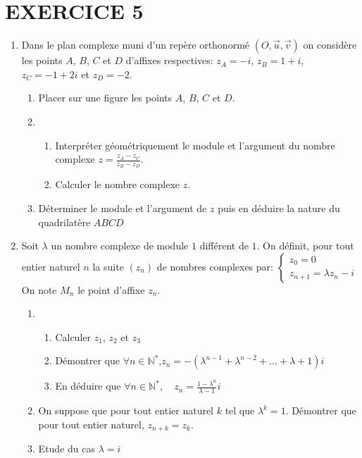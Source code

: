 \documentclass[13pts]{report}
\begin{document}
	\section*{EXERCICE 5}
	\begin{enumerate}
		\item Dans le plan complexe muni d'un repère orthonormé $(O,\overrightarrow{u},\overrightarrow{v})$ on considère les points $A$, $B$, $C$ et $D$ d'affixes respectives: $z_A=-i$, $z_B=1+i$, $z_C=-1+2i$ et $z_D=-2$.
			\begin{enumerate}
				\item Placer sur une figure les points $A$, $B$, $C$ et $D$.
				\item \begin{enumerate}
						\item Interpréter géométriquement le module et l'argument du nombre complexe $z=\frac{z_A-z_C}{z_B-z_D}$.
						\item Calculer le nombre complexe $z$.
				   	  \end{enumerate}
				\item Déterminer le module et l'argument de $z$ puis en déduire la nature du quadrilatère $ABCD$
			\end{enumerate}
		\item Soit $\lambda$ un nombre complexe de module $1$ différent de $1$. On définit, pour tout entier naturel $n$ la suite $(z_n)$ de nombres complexes par: $\left\{\begin{array}{l}
																		z_0=0\\
																		z_{n+1}=\lambda z_n-i
																	\end{array}   \right.$
		On note $M_n$ le point d'affixe $z_n$.
			\begin{enumerate}
				\item \begin{enumerate}
						\item Calculer $z_1$, $z_2$ et $z_3$
						\item Démontrer que $\forall n \in \mathbb{N}^*$,\quad $z_n=-(\lambda^{n-1}+\lambda^{n-2}+ \dots +\lambda+1)i$
						\item En déduire que $\forall n \in \mathbb{N}^*, \quad z_n=\frac{1-\lambda^n}{\lambda-1}i$
					\end{enumerate}
				\item On suppose que pour tout entier naturel $k$ tel que $\lambda^k=1$. Démontrer que pour tout entier naturel, $z_{n+k}=z_k$.
				\item Etude du cas $\lambda=i$

\end{enumerate}
\end{enumerate}
\end{document}

